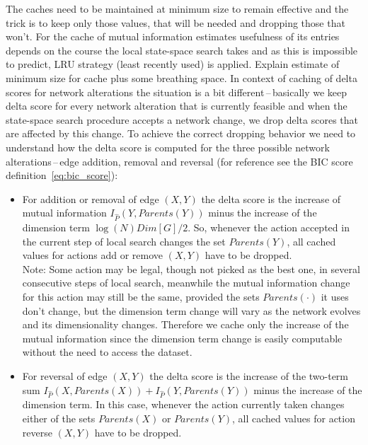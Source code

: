 \documentclass[english,cover]{fitthesis} %
\newcommand{\todo}[1]{{\color{red}#1}}
\begin{document}
The caches need to be maintained at minimum size to remain effective and the trick is to keep only those values, that will be needed and dropping those that won't. For the cache of mutual information estimates usefulness of its entries depends on the course the local state-space search takes and as this is impossible to predict, LRU strategy (least recently used) is applied. \todo{Explain estimate of minimum size for cache plus some breathing space.} In context of caching of delta scores for network alterations the situation is a bit different\,--\,basically we keep delta score for every network alteration that is currently feasible and when the state-space search procedure accepts a network change, we drop delta scores that are affected by this change. To achieve the correct dropping behavior we need to understand how the delta score is computed for the three possible network alterations\,--\,edge addition, removal and reversal (for reference see the BIC score definition~\eqref{eq:bic_score}):
\begin{itemize}
	\item For addition or removal of edge $(X,Y)$ the delta score is the increase of mutual information $I_{\hat P}(Y,Parents(Y))$ minus the increase of the dimension term $\log(N) Dim[G] / 2$. So, whenever the action accepted in the current step of local search changes the set $Parents(Y)$, all cached values for actions add or remove $(X,Y)$ have to be dropped.\medskip \\
	Note: Some action may be legal, though not picked as the best one, in several consecutive steps of local search, meanwhile the mutual information change for this action may still be the same, provided the sets $Parents(\cdot)$ it uses don't change, but the dimension term change will vary as the network evolves and its dimensionality changes. Therefore we cache only the increase of the mutual information since the dimension term change is easily computable without the need to access the dataset.
	\item For reversal of edge $(X,Y)$ the delta score is the increase of the two-term sum $I_{\hat P}(X,Parents(X)) + I_{\hat P}(Y,Parents(Y))$ minus the increase of the dimension term. In this case, whenever the action currently taken changes either of the sets $Parents(X)$ or $Parents(Y)$, all cached values for action reverse $(X,Y)$ have to be dropped.
\end{itemize}
\end{document}

